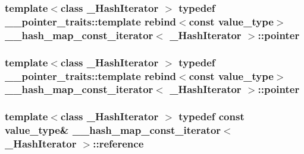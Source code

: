 \subsubsection[{pointer}]{\setlength{\rightskip}{0pt plus 5cm}template$<$class \+\_\+\+Hash\+Iterator $>$ typedef \+\_\+\+\_\+pointer\+\_\+traits\+::template rebind$<$const {\bf value\+\_\+type}$>$ {\bf \+\_\+\+\_\+hash\+\_\+map\+\_\+const\+\_\+iterator}$<$ \+\_\+\+Hash\+Iterator $>$\+::{\bf pointer}}\label{class____hash__map__const__iterator_a4bb73ff2685ed4941c03a85bf4248e90}
\hypertarget{class____hash__map__const__iterator_a4bb73ff2685ed4941c03a85bf4248e90}{}
\subsubsection[{pointer}]{\setlength{\rightskip}{0pt plus 5cm}template$<$class \+\_\+\+Hash\+Iterator $>$ typedef \+\_\+\+\_\+pointer\+\_\+traits\+::template rebind$<$const {\bf value\+\_\+type}$>$ {\bf \+\_\+\+\_\+hash\+\_\+map\+\_\+const\+\_\+iterator}$<$ \+\_\+\+Hash\+Iterator $>$\+::{\bf pointer}}\label{class____hash__map__const__iterator_a4bb73ff2685ed4941c03a85bf4248e90}
\hypertarget{class____hash__map__const__iterator_a94a3447535fb67a3c48b0acded52fd84}{}
\subsubsection[{reference}]{\setlength{\rightskip}{0pt plus 5cm}template$<$class \+\_\+\+Hash\+Iterator $>$ typedef const {\bf value\+\_\+type}\& {\bf \+\_\+\+\_\+hash\+\_\+map\+\_\+const\+\_\+iterator}$<$ \+\_\+\+Hash\+Iterator $>$\+::{\bf reference}}\label{class____hash__map__const__iterator_a94a3447535fb67a3c48b0acded52fd84}
\hypertarget{class____hash__map__const__iterator_a94a3447535fb67a3c48b0acded52fd84}{}
